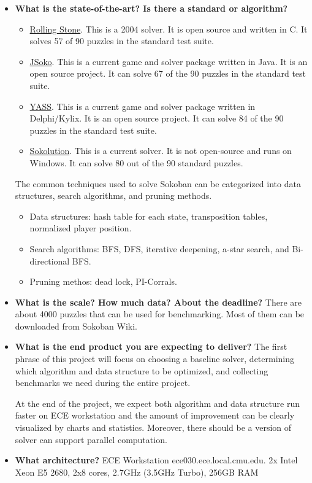 \documentclass[10pt, notitlepage]{article}
\begin{document}
\begin{itemize}
    
    \item \textbf{What is the state-of-the-art? Is there a standard or algorithm?}
    \begin{itemize}
        \item \href{https://webdocs.cs.ualberta.ca/~games/Sokoban/program.html}{Rolling Stone}. This is a 2004 solver. It is open source and written in C. It solves 57 of 90 puzzles in the standard test suite.
        \item \href{http://sokobano.de/wiki/index.php?title=JSoko_Solver}{JSoko}. This is a current game and solver package written in Java. It is an open source project. It can solve 67 of the 90 puzzles in the standard test suite.
        \item \href{http://sourceforge.net/projects/sokobanyasc/}{YASS}. This is a current game and solver package written in Delphi/Kylix. It is an open source project. It can solve 84 of the 90 puzzles in the standard test suite.
        \item \href{http://codeanalysis.fr/sokoban/}{Sokolution}. This is a current solver. It is not open-source and runs on Windows. It can solve 80 out of the 90 standard puzzles.
    \end{itemize}
    
    The common techniques used to solve Sokoban can be categorized into data structures, search algorithms, and pruning methods.
    
    \begin{itemize}
        \item Data structures: hash table for each state, transposition tables, normalized player position.
        \item Search algorithms: BFS, DFS, iterative deepening, a-star search, and Bi-directional BFS.
        \item Pruning methos: dead lock, PI-Corrals.
    \end{itemize}

    \item \textbf{What is the scale? How much data? About the deadline?} There are about 4000 puzzles that can be used for benchmarking. Most of them can be downloaded from Sokoban Wiki.

    \item \textbf{What is the end product you are expecting to deliver?} The first phrase of this project will focus on choosing a baseline solver, determining which algorithm and data structure to be optimized, and collecting benchmarks we need during the entire project.
        
        At the end of the project, we expect both algorithm and data structure run faster on ECE workstation and the amount of improvement can be clearly visualized by charts and statistics. Moreover, there should be a version of solver can support parallel computation.

    \item \textbf{What architecture?} ECE Workstation ece030.ece.local.cmu.edu. 2x Intel Xeon E5 2680, 2x8 cores, 2.7GHz (3.5GHz Turbo), 256GB RAM
    
\end{itemize}
\end{document}
